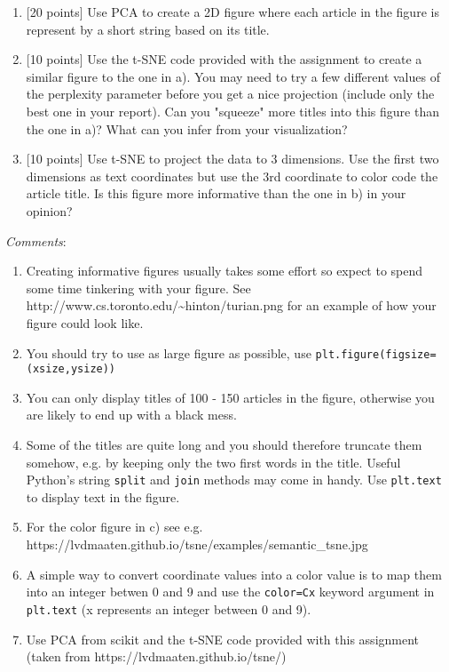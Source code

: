 \documentclass[11pt]{article}
\begin{document}
\begin{enumerate}
\def\labelenumi{\alph{enumi})}
\item
  {[}20 points{]} Use PCA to create a 2D figure where each article in
  the figure is represent by a short string based on its title.
\item
  {[}10 points{]} Use the t-SNE code provided with the assignment to
  create a similar figure to the one in a). You may need to try a few
  different values of the perplexity parameter before you get a nice
  projection (include only the best one in your report). Can you
  "squeeze" more titles into this figure than the one in a)? What can
  you infer from your visualization?
\item
  {[}10 points{]} Use t-SNE to project the data to 3 dimensions. Use the
  first two dimensions as text coordinates but use the 3rd coordinate to
  color code the article title. Is this figure more informative than the
  one in b) in your opinion?
\end{enumerate}

\emph{Comments}:

\begin{enumerate}
\def\labelenumi{\arabic{enumi})}
\item
  Creating informative figures usually takes some effort so expect to
  spend some time tinkering with your figure. See
  http://www.cs.toronto.edu/\textasciitilde{}hinton/turian.png for an
  example of how your figure could look like.
\item
  You should try to use as large figure as possible, use
  \texttt{plt.figure(figsize=(xsize,ysize))}
\item
  You can only display titles of 100 - 150 articles in the figure,
  otherwise you are likely to end up with a black mess.
\item
  Some of the titles are quite long and you should therefore truncate
  them somehow, e.g. by keeping only the two first words in the title.
  Useful Python's string \texttt{split} and \texttt{join} methods may
  come in handy. Use \texttt{plt.text} to display text in the figure.
\item
  For the color figure in c) see e.g.
  https://lvdmaaten.github.io/tsne/examples/semantic\_tsne.jpg
\item
  A simple way to convert coordinate values into a color value is to map
  them into an integer betwen 0 and 9 and use the \texttt{color=Cx}
  keyword argument in \texttt{plt.text} (x represents an integer between
  0 and 9).
\item
  Use PCA from scikit and the t-SNE code provided with this assignment
  (taken from https://lvdmaaten.github.io/tsne/)
\end{enumerate}
\end{document}
